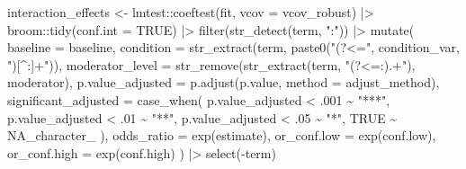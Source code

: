 \documentclass[
  letterpaper,
  DIV=11,
  numbers=noendperiod]{scrartcl}
\newenvironment{Shaded}{\begin{snugshade}}{\end{snugshade}}
\newcommand{\AttributeTok}[1]{\textcolor[rgb]{0.40,0.45,0.13}{#1}}
\newcommand{\ConstantTok}[1]{\textcolor[rgb]{0.56,0.35,0.01}{#1}}
\newcommand{\DecValTok}[1]{\textcolor[rgb]{0.68,0.00,0.00}{#1}}
\newcommand{\FunctionTok}[1]{\textcolor[rgb]{0.28,0.35,0.67}{#1}}
\newcommand{\NormalTok}[1]{\textcolor[rgb]{0.00,0.23,0.31}{#1}}
\newcommand{\OtherTok}[1]{\textcolor[rgb]{0.00,0.23,0.31}{#1}}
\newcommand{\SpecialCharTok}[1]{\textcolor[rgb]{0.37,0.37,0.37}{#1}}
\newcommand{\StringTok}[1]{\textcolor[rgb]{0.13,0.47,0.30}{#1}}
\begin{document}
\begin{Shaded}
\begin{Highlighting}[]
\NormalTok{  interaction\_effects }\OtherTok{\textless{}{-}}\NormalTok{ lmtest}\SpecialCharTok{::}\FunctionTok{coeftest}\NormalTok{(fit, }\AttributeTok{vcov =}\NormalTok{ vcov\_robust) }\SpecialCharTok{|\textgreater{}}
\NormalTok{    broom}\SpecialCharTok{::}\FunctionTok{tidy}\NormalTok{(}\AttributeTok{conf.int =} \ConstantTok{TRUE}\NormalTok{) }\SpecialCharTok{|\textgreater{}}
    \FunctionTok{filter}\NormalTok{(}\FunctionTok{str\_detect}\NormalTok{(term, }\StringTok{":"}\NormalTok{)) }\SpecialCharTok{|\textgreater{}}
    \FunctionTok{mutate}\NormalTok{(}
      \AttributeTok{baseline             =}\NormalTok{ baseline,}
      \AttributeTok{condition            =} \FunctionTok{str\_extract}\NormalTok{(term, }\FunctionTok{paste0}\NormalTok{(}\StringTok{"(?\textless{}="}\NormalTok{, condition\_var, }\StringTok{")[\^{}:]+"}\NormalTok{)),}
      \AttributeTok{moderator\_level      =} \FunctionTok{str\_remove}\NormalTok{(}\FunctionTok{str\_extract}\NormalTok{(term, }\StringTok{"(?\textless{}=:).+"}\NormalTok{), moderator),}
      \AttributeTok{p.value\_adjusted     =} \FunctionTok{p.adjust}\NormalTok{(p.value, }\AttributeTok{method =}\NormalTok{ adjust\_method),}
      \AttributeTok{significant\_adjusted =} \FunctionTok{case\_when}\NormalTok{(}
\NormalTok{        p.value\_adjusted }\SpecialCharTok{\textless{}}\NormalTok{ .}\DecValTok{001} \SpecialCharTok{\textasciitilde{}} \StringTok{"***"}\NormalTok{,}
\NormalTok{        p.value\_adjusted }\SpecialCharTok{\textless{}}\NormalTok{ .}\DecValTok{01}  \SpecialCharTok{\textasciitilde{}} \StringTok{"**"}\NormalTok{,}
\NormalTok{        p.value\_adjusted }\SpecialCharTok{\textless{}}\NormalTok{ .}\DecValTok{05}  \SpecialCharTok{\textasciitilde{}} \StringTok{"*"}\NormalTok{,}
        \ConstantTok{TRUE}                    \SpecialCharTok{\textasciitilde{}} \ConstantTok{NA\_character\_}
\NormalTok{      ),}
      \AttributeTok{odds\_ratio   =} \FunctionTok{exp}\NormalTok{(estimate),}
      \AttributeTok{or\_conf.low  =} \FunctionTok{exp}\NormalTok{(conf.low),}
      \AttributeTok{or\_conf.high =} \FunctionTok{exp}\NormalTok{(conf.high)}
\NormalTok{    ) }\SpecialCharTok{|\textgreater{}}
    \FunctionTok{select}\NormalTok{(}\SpecialCharTok{{-}}\NormalTok{term)}
  

\end{Highlighting}
\end{Shaded}
\end{document}
